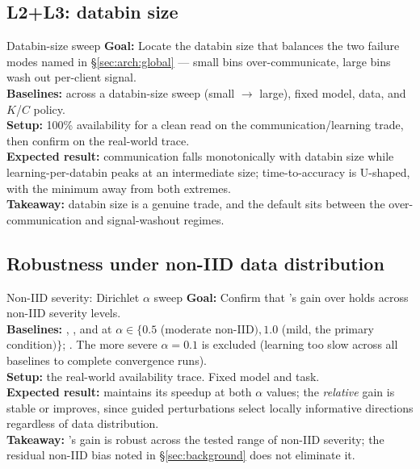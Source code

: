 \subsection{L2+L3: databin size}
\label{sec:ablation:databin}

\begin{plannedexp}{Databin-size sweep}
  \textbf{Goal:} Locate the databin size that balances the two failure
  modes named in \S\ref{sec:arch:global} --- small bins
  over-communicate, large bins wash out per-client signal.\\[3pt]
  \textbf{Baselines:} \sys{} across a databin-size sweep (small $\to$
  large), fixed model, data, and $K$/$C$ policy.\\[3pt]
  \textbf{Setup:} 100\% availability for a clean read on the
  communication/learning trade, then confirm on the real-world
  trace.\\[3pt]
  \textbf{Expected result:} communication falls monotonically with
  databin size while learning-per-databin peaks at an intermediate
  size; time-to-accuracy is U-shaped, with the minimum away from both
  extremes.\\[3pt]
  \textbf{Takeaway:} databin size is a genuine trade, and the default
  sits between the over-communication and signal-washout regimes.
\end{plannedexp}

\subsection{Robustness under non-IID data distribution}
\label{sec:ablation:noniid}

\begin{plannedexp}{Non-IID severity: Dirichlet $\alpha$ sweep}
  \textbf{Goal:} Confirm that \sys{}'s gain over \fwdllm{} holds
  across non-IID severity levels.\\[3pt]
  \textbf{Baselines:} \fwdllm{}, \fwdllmito{}, and \sys{} at $\alpha
  \in \{0.5$ (moderate non-IID$), 1.0$ (mild, the primary
  condition$)\}$; . The more severe $\alpha{=}0.1$ is excluded (learning too slow
  across all baselines to complete convergence runs).\\[3pt]
  \textbf{Setup:} the real-world availability trace. Fixed model and
  task.\\[3pt]
  \textbf{Expected result:} \sys{} maintains its speedup at both
  $\alpha$ values; the \emph{relative} gain is stable or improves,
  since guided perturbations select locally informative directions
  regardless of data distribution.\\[3pt]
  \textbf{Takeaway:} \sys{}'s gain is robust across the tested range
  of non-IID severity; the residual non-IID bias noted in
  \S\ref{sec:background} does not eliminate it.
\end{plannedexp}

